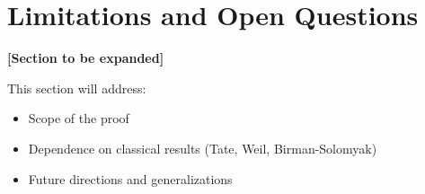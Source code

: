 \section{Limitations and Open Questions}
\label{sec:limitations}

\textbf{[Section to be expanded]}

This section will address:
\begin{itemize}
\item Scope of the proof
\item Dependence on classical results (Tate, Weil, Birman-Solomyak)
\item Future directions and generalizations
\end{itemize}
